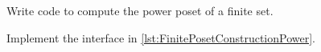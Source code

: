 
\begin{codeexercise}
    Write code to compute the power poset of a finite set.

    Implement the interface in \cref{lst:FinitePosetConstructionPower}.
\end{codeexercise}

